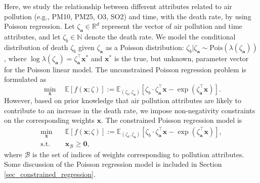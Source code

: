 \documentclass[aos]{imsart}
\numberwithin{equation}{section}
\theoremstyle{plain}
\begin{document}
Here, we study the relationship between different attributes related to air pollution (e.g., PM10, PM25, O3, SO2) and time, with the death rate, by using Poisson regression. 
Let $\zeta_{\bm{a}} \in \mathbb{R}^{d}$ represent the vector of air pollution and time attributes, and let $\zeta_{b} \in \mathbb{N}$ denote the death rate.
We model the conditional distribution of death $\zeta_{b}$ given $\zeta_{\bm{a}}$ as a Poisson distribution: $\zeta_{b}|\zeta_{\bm{a}}  \sim \text{Pois}(\lambda(\zeta_{\bm{a}}))$, where $\log \lambda(\zeta_{\bm{a}}) = \zeta_{\bm{a}}^{\top} \bm{x}^{*}$ and $\bm{x}^{*}$ is the true, but unknown, parameter vector for the Poisson linear model.
The unconstrained Poisson regression problem is formulated as 
    \begin{equation}
    \label{poisson_unconstrained}
            \min_{\bm{x}} \hspace{1em} \mathbb{E} \left[f(\bm{x};\zeta) \right] := \mathbb{E}_{(\zeta_{b},\zeta_{\bm{a}})} \left[ \zeta_{b} \cdot \zeta_{\bm{a}}^{\top} \bm{x} - \exp \left(\zeta_{\bm{a}}^{\top} \bm{x} \right) \right].
    \end{equation}
However, based on prior knowledge that air pollution attributes are likely to contribute to an increase in the death rate, we impose non-negativity constraints on the corresponding weights $\bm{x}$.
The constrained Poisson regression model is
\begin{equation}
 \label{poisson_constrained}
        \begin{split}
            \min_{\bm{x}} &  \hspace{1em} \mathbb{E} \left[f(\bm{x};\zeta) \right] := \mathbb{E}_{(\zeta_{b},\zeta_{\bm{a}})} \left[ \zeta_{b} \cdot \zeta_{\bm{a}}^{\top} \bm{x} - \exp \left(\zeta_{\bm{a}}^{\top} \bm{x} \right) \right], \\
            \text{s.t.} & \hspace{1em} \bm{x}_{\mathcal{B}} \geq \bm{0},
        \end{split}
    \end{equation}
    where $\mathcal{B}$ is the set of indices of weights corresponding to pollution attributes. 
    Some discussion of the Poisson regression model is included in Section \ref{sec_constrained_regression}.
\end{document}

